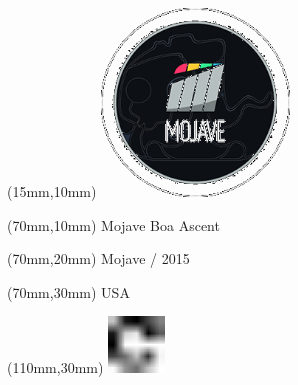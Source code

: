 \null\newpage
\begin{textblock*}{50mm}(15mm,10mm)%
\includegraphics[width=50mm]{LG/MOJ.png}
\end{textblock*}
\begin{textblock*}{130mm}(70mm,10mm)%
{\fontsize{20}{20}\selectfont Mojave Boa Ascent}\\
\end{textblock*}
\begin{textblock*}{120mm}(70mm,20mm)%
{\fontsize{16}{16}\selectfont Mojave / 2015}\\
\end{textblock*}
\begin{textblock*}{120mm}(70mm,30mm)%
{\fontsize{12}{12}\selectfont USA}
\end{textblock*}
\begin{textblock*}{30mm}(110mm,30mm)%
\centering
\includegraphics[height=15mm]{icons/fa-rotate-right.pdf}
\end{textblock*}
